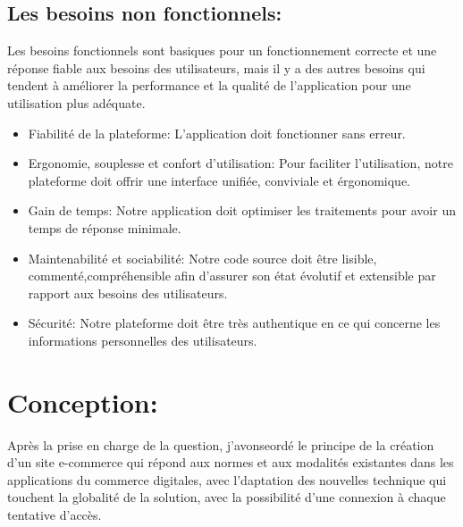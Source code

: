 \documentclass[a4paper]{report}
\begin{document}
\begin{doublespace}
	\subsection{Les besoins non fonctionnels:}
	Les besoins fonctionnels sont basiques pour un fonctionnement
	correcte et une réponse fiable aux besoins des utilisateurs, mais il y a des
	autres besoins qui tendent à améliorer la performance et la qualité de
	l'application pour une utilisation plus adéquate.
	\begin{itemize}
		\item Fiabilité de la plateforme: L’application doit
		      fonctionner sans erreur.
		\item Ergonomie, souplesse et confort d’utilisation: Pour
		      faciliter l’utilisation, notre plateforme doit offrir une interface unifiée,
		      conviviale et érgonomique.
		\item Gain de temps: Notre application doit optimiser les
		      traitements pour avoir un temps de réponse minimale.
		\item Maintenabilité et sociabilité: Notre code source doit
		      être lisible, commenté,compréhensible afin d’assurer son état évolutif et
		      extensible par rapport aux besoins des utilisateurs.
		\item Sécurité: Notre plateforme doit  être très
		      authentique en ce qui concerne les informations personnelles des utilisateurs.
	\end{itemize}
	\section{Conception:}
	
	Après la prise en charge de la question, j'avonseordé le
	principe de la création d'un site e-commerce qui répond aux normes et aux
	modalités existantes dans les applications du commerce digitales, avec
	l'daptation des nouvelles technique qui touchent la globalité de la solution,
	avec la possibilité d'une connexion à chaque tentative d'accès.

\end{doublespace}
\end{document}
